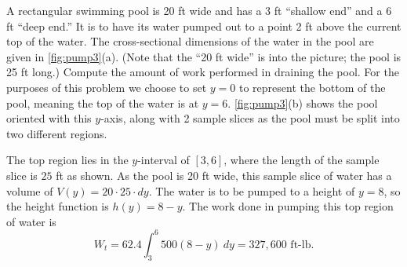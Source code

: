 \begin{example}\label{ex_pump3}
A rectangular swimming pool is 20 ft wide and has a 3 ft ``shallow end'' and a 6 ft ``deep end.'' It is to have its water pumped out to a point 2 ft above the current top of the water. The cross-sectional dimensions of the water in the pool are given in \autoref{fig:pump3}(a). (Note that the ``20 ft wide'' is into the picture; the pool is 25 ft long.) Compute the amount of work performed in draining the pool.
\solution
For the purposes of this problem we choose to set $y=0$ to represent the bottom of the pool, meaning the top of the water is at $y=6$.
\autoref{fig:pump3}(b) shows the pool oriented with this $y$-axis, along with 2 sample slices as the pool must be split into two different regions. 

The top region lies in the $y$-interval of $[3,6]$, where the length of the sample slice is $25$ ft as shown. As the pool is 20 ft wide, this sample slice of water has a volume of $V(y) = 20\cdot25\cdot dy$.  The water is to be pumped to a height of $y=8$, so the height function is $h(y) = 8-y$. The work done in pumping this top region of water is 
\[W_t = 62.4\int_3^6 500(8-y)\ dy = 327,600 \text{ ft-lb}.\]


\end{example}
